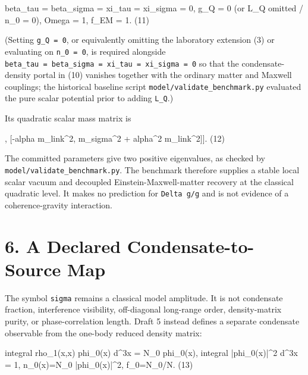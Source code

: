 \documentclass[
  american,
  11pt,
  letterpaper,
]{article}
\newenvironment{Shaded}{}{}
\newcommand{\NormalTok}[1]{#1}
\begin{document}
\begin{Shaded}
\begin{Highlighting}[]
\NormalTok{beta\_tau = beta\_sigma = xi\_tau = xi\_sigma = 0,}
\NormalTok{g\_Q = 0   (or L\_Q omitted / n\_0 = 0),}
\NormalTok{Omega = 1,}
\NormalTok{f\_EM = 1.                                                       (11)}
\end{Highlighting}
\end{Shaded}

(Setting \texttt{g\_Q\ =\ 0}, or equivalently omitting the laboratory extension (3) or evaluating on \texttt{n\_0\ =\ 0}, is required alongside \texttt{beta\_tau\ =\ beta\_sigma\ =\ xi\_tau\ =\ xi\_sigma\ =\ 0} so that the condensate-density portal in (10) vanishes together with the ordinary matter and Maxwell couplings; the historical baseline script \nolinkurl{model/validate_benchmark.py} evaluated the pure scalar potential prior to adding \texttt{L\_Q}.)

Its quadratic scalar mass matrix is

\begin{Shaded}
\begin{Highlighting}[]
\NormalTok{[[m\_tau\^{}2 + m\_link\^{}2,        {-}alpha m\_link\^{}2],}
\NormalTok{ [{-}alpha m\_link\^{}2, m\_sigma\^{}2 + alpha\^{}2 m\_link\^{}2]].              (12)}
\end{Highlighting}
\end{Shaded}

The committed parameters give two positive eigenvalues, as checked by \nolinkurl{model/validate_benchmark.py}. The benchmark therefore supplies a stable local scalar vacuum and decoupled Einstein-Maxwell-matter recovery at the classical quadratic level. It makes no prediction for \texttt{Delta\ g/g} and is not evidence of a coherence-gravity interaction.

\section{6. A Declared Condensate-to-Source Map}\label{a-declared-condensate-to-source-map}

The symbol \texttt{sigma} remains a classical model amplitude. It is not condensate fraction, interference visibility, off-diagonal long-range order, density-matrix purity, or phase-correlation length. Draft 5 instead defines a separate condensate observable from the one-body reduced density matrix:

\begin{Shaded}
\begin{Highlighting}[]
\NormalTok{integral rho\_1(x,x\textquotesingle{}) phi\_0(x\textquotesingle{}) d\^{}3x\textquotesingle{} = N\_0 phi\_0(x),}
\NormalTok{integral |phi\_0(x)|\^{}2 d\^{}3x = 1,}
\NormalTok{n\_0(x)=N\_0 |phi\_0(x)|\^{}2,}
\NormalTok{f\_0=N\_0/N.                                                       (13)}
\end{Highlighting}
\end{Shaded}
\end{document}
